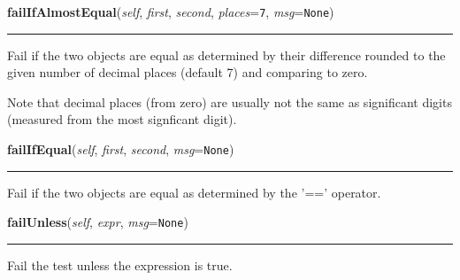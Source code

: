     \label{unittest:TestCase:failIfAlmostEqual}

    \vspace{0.5ex}

    \begin{boxedminipage}{\textwidth}

    \raggedright \textbf{failIfAlmostEqual}(\textit{self}, \textit{first}, \textit{second}, \textit{places}=\texttt{7}, \textit{msg}=\texttt{None})

    \vspace{-1.5ex}

    \rule{\textwidth}{0.5\fboxrule}
    Fail if the two objects are equal as determined by their difference 
    rounded to the given number of decimal places (default 7) and comparing
    to zero.

    Note that decimal places (from zero) are usually not the same as 
    significant digits (measured from the most signficant digit).

    \vspace{1ex}

    \end{boxedminipage}

    \label{unittest:TestCase:failIfEqual}

    \vspace{0.5ex}

    \begin{boxedminipage}{\textwidth}

    \raggedright \textbf{failIfEqual}(\textit{self}, \textit{first}, \textit{second}, \textit{msg}=\texttt{None})

    \vspace{-1.5ex}

    \rule{\textwidth}{0.5\fboxrule}
    Fail if the two objects are equal as determined by the '==' operator.

    \vspace{1ex}

    \end{boxedminipage}

    \label{unittest:TestCase:failUnless}

    \vspace{0.5ex}

    \begin{boxedminipage}{\textwidth}

    \raggedright \textbf{failUnless}(\textit{self}, \textit{expr}, \textit{msg}=\texttt{None})

    \vspace{-1.5ex}

    \rule{\textwidth}{0.5\fboxrule}
    Fail the test unless the expression is true.

    \vspace{1ex}

    \end{boxedminipage}

